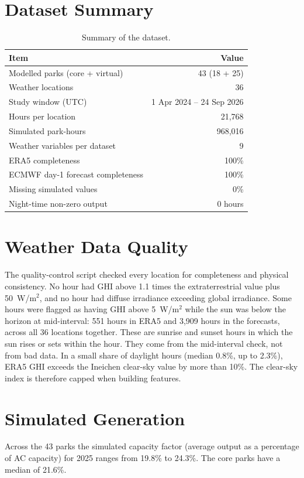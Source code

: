 \documentclass[12pt]{report}
\begin{document}
\section{Dataset Summary}
\vspace{1mm}
\begin{table}[htbp]
\centering
\caption{Summary of the dataset.}
\label{tab:datasum}
\begin{tabular}{lr}
\toprule
Item & Value \\
\midrule
Modelled parks (core + virtual) & 43 (18 + 25) \\
Weather locations & 36 \\
Study window (UTC) & 1 Apr 2024 -- 24 Sep 2026 \\
Hours per location & 21,768 \\
Simulated park-hours & 968,016 \\
Weather variables per dataset & 9 \\
ERA5 completeness & 100\% \\
ECMWF day-1 forecast completeness & 100\% \\
Missing simulated values & 0\% \\
Night-time non-zero output & 0 hours \\
\bottomrule
\end{tabular}
\end{table}

\section{Weather Data Quality}
\vspace{1mm}
The quality-control script checked every location for completeness and physical consistency. No hour had GHI above 1.1 times the extraterrestrial value plus 50~W/m$^2$, and no hour had diffuse irradiance exceeding global irradiance. Some hours were flagged as having GHI above 5~W/m$^2$ while the sun was below the horizon at mid-interval: 551 hours in ERA5 and 3,909 hours in the forecasts, across all 36 locations together. These are sunrise and sunset hours in which the sun rises or sets within the hour. They come from the mid-interval check, not from bad data. In a small share of daylight hours (median 0.8\%, up to 2.3\%), ERA5 GHI exceeds the Ineichen clear-sky value by more than 10\%. The clear-sky index is therefore capped when building features.

\section{Simulated Generation}
\vspace{1mm}
Across the 43 parks the simulated capacity factor (average output as a percentage of AC capacity) for 2025 ranges from 19.8\% to 24.3\%. The core parks have a median of 21.6\%.
\end{document}
